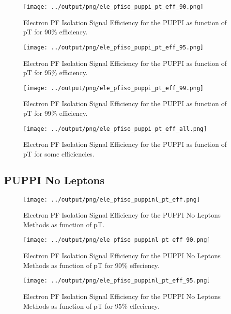 \documentclass[11pt]{book}
\begin{document}
\begin{figure}[htb]
\centering
\texttt{[image: ../output/png/ele\_pfiso\_puppi\_pt\_eff\_90.png]}
\caption{Electron PF Isolation Signal Efficiency for the PUPPI as function of pT for 90\% efficiency.}
\label{fig:ele_pfiso_pt_eff_puppi_eff_90}
\end{figure}

\begin{figure}[htb]
\centering
\texttt{[image: ../output/png/ele\_pfiso\_puppi\_pt\_eff\_95.png]}
\caption{Electron PF Isolation Signal Efficiency for the PUPPI as function of pT for 95\% efficiency.}
\label{fig:ele_pfiso_pt_eff_puppi_eff_95}
\end{figure}

\begin{figure}[htb]
\centering
\texttt{[image: ../output/png/ele\_pfiso\_puppi\_pt\_eff\_99.png]}
\caption{Electron PF Isolation Signal Efficiency for the PUPPI as function of pT for 99\% efficiency.}
\label{fig:ele_pfiso_pt_eff_puppi_eff_99}
\end{figure}

\begin{figure}[htb]
\centering
\texttt{[image: ../output/png/ele\_pfiso\_puppi\_pt\_eff\_all.png]}
\caption{Electron PF Isolation Signal Efficiency for the PUPPI as function of pT for some efficiencies.}
\label{fig:ele_pfiso_pt_eff_puppi_eff_all}
\end{figure}
\clearpage

\subsection{PUPPI No Leptons}
\begin{figure}[htb]
\centering
\texttt{[image: ../output/png/ele\_pfiso\_puppinl\_pt\_eff.png]}
\caption{Electron PF Isolation Signal Efficiency for the PUPPI No Leptons Methods as function of pT.}
\label{fig:ele_pfiso_pt_eff_puppinl}
\end{figure}

\begin{figure}[htb]
\centering
\texttt{[image: ../output/png/ele\_pfiso\_puppinl\_pt\_eff\_90.png]}
\caption{Electron PF Isolation Signal Efficiency for the PUPPI No Leptons Methods as function of pT for 90\% effeciency.}
\label{fig:ele_pfiso_pt_eff_puppinl_eff_90}
\end{figure}

\begin{figure}[htb]
\centering
\texttt{[image: ../output/png/ele\_pfiso\_puppinl\_pt\_eff\_95.png]}
\caption{Electron PF Isolation Signal Efficiency for the PUPPI No Leptons Methods as function of pT for 95\% effeciency.}
\label{fig:ele_pfiso_pt_eff_puppinl_eff_95}
\end{figure}
\end{document}
